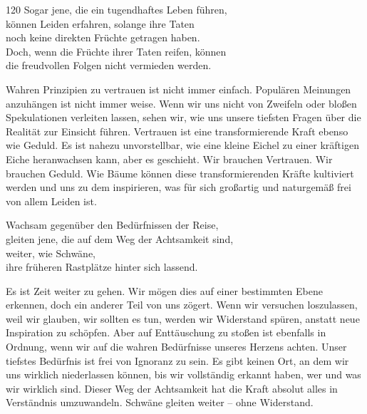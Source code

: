 
\begin{dhpVerse}{120}
\label{dhp-120}
Sogar jene, die ein tugendhaftes Leben führen,\\ 
können Leiden erfahren, solange ihre Taten\\ 
noch keine direkten Früchte getragen haben.\\ 
Doch, wenn die Früchte ihrer Taten reifen, können\\ 
die freudvollen Folgen nicht vermieden werden. 
\end{dhpVerse}

\begin{dhpRefl}

Wahren Prinzipien zu vertrauen ist nicht immer einfach. Populären Meinungen
anzuhängen ist nicht immer weise. Wenn wir uns nicht von Zweifeln oder bloßen
Spekulationen verleiten lassen, sehen wir, wie uns unsere tiefsten Fragen über
die Realität zur Einsicht führen. Vertrauen ist eine transformierende Kraft
ebenso wie Geduld. Es ist nahezu unvorstellbar, wie eine kleine Eichel zu
einer kräftigen Eiche heranwachsen kann, aber es geschieht. Wir brauchen
Vertrauen. Wir brauchen Geduld. Wie Bäume können diese transformierenden
Kräfte kultiviert werden und uns zu dem inspirieren, was für sich großartig
und naturgemäß frei von allem Leiden ist.

\end{dhpRefl}


\begin{dhpVerse}{91}
\label{dhp-91}
Wachsam gegenüber den Bedürfnissen der Reise,\\ 
gleiten jene, die auf dem Weg der Achtsamkeit sind,\\
weiter, wie Schwäne,\\
ihre früheren Rastplätze hinter sich lassend. 
\end{dhpVerse}

\begin{dhpRefl}

Es ist Zeit weiter zu gehen. Wir mögen dies auf einer bestimmten Ebene
erkennen, doch ein anderer Teil von uns zögert. Wenn wir versuchen
loszulassen, weil wir glauben, wir sollten es tun, werden wir Widerstand
spüren, anstatt neue Inspiration zu schöpfen. Aber auf Enttäuschung zu stoßen
ist ebenfalls in Ordnung, wenn wir auf die wahren Bedürfnisse unseres Herzens
achten. Unser tiefstes Bedürfnis ist frei von Ignoranz zu sein. Es gibt keinen
Ort, an dem wir uns wirklich niederlassen können, bis wir vollständig erkannt
haben, wer und was wir wirklich sind. Dieser Weg der Achtsamkeit hat die Kraft
absolut alles in Verständnis umzuwandeln. Schwäne gleiten weiter -- ohne
Widerstand.

\end{dhpRefl}

